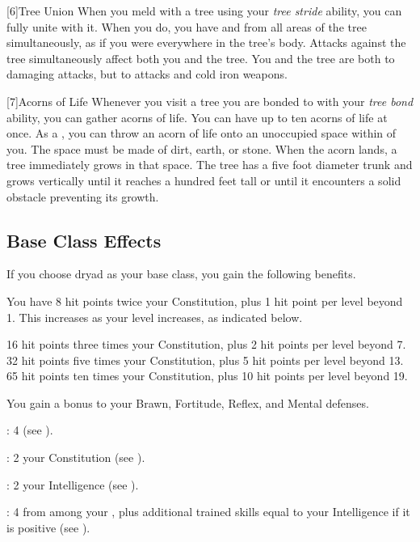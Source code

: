     [6]{Tree Union} When you meld with a tree using your \textit{tree stride} ability, you can fully unite with it.
      When you do, you have  and  from all areas of the tree simultaneously, as if you were everywhere in the tree's body.
      Attacks against the tree simultaneously affect both you and the tree.
      You and the tree are both \impervious to damaging attacks, but \vulnerable to \atFire attacks and cold iron weapons.

    [7]{Acorns of Life} Whenever you visit a tree you are bonded to with your \textit{tree bond} ability, you can gather acorns of life.
      You can have up to ten acorns of life at once.
      As a , you can throw an acorn of life onto an unoccupied  space within \medrange of you.
      The space must be made of dirt, earth, or stone.
      When the acorn lands, a tree immediately grows in that space.
      The tree has a five foot diameter trunk and grows vertically until it reaches a hundred feet tall or until it encounters a solid obstacle preventing its growth.

  \subsection{Base Class Effects}
    \mediumhpprogressiontable

    If you choose dryad as your base class, you gain the following benefits.

      You have 8 hit points \add twice your Constitution, plus 1 hit point per level beyond 1.
      This increases as your level increases, as indicated below.
      \begin{raggeditemize}
         16 hit points \add three times your Constitution, plus 2 hit points per level beyond 7.
         32 hit points \add five times your Constitution, plus 5 hit points per level beyond 13.
         65 hit points \add ten times your Constitution, plus 10 hit points per level beyond 19.
      \end{raggeditemize}

      You gain a  bonus to your Brawn, Fortitude, Reflex, and Mental defenses.

      \begin{raggeditemize}
          \item {}: 4 (see ).
          \item {}: 2 \add your Constitution (see ).
          \item {}: 2 \add your Intelligence (see ).
          \item {}: 4 from among your , plus additional trained skills equal to your Intelligence if it is positive (see ).
      \end{raggeditemize}


